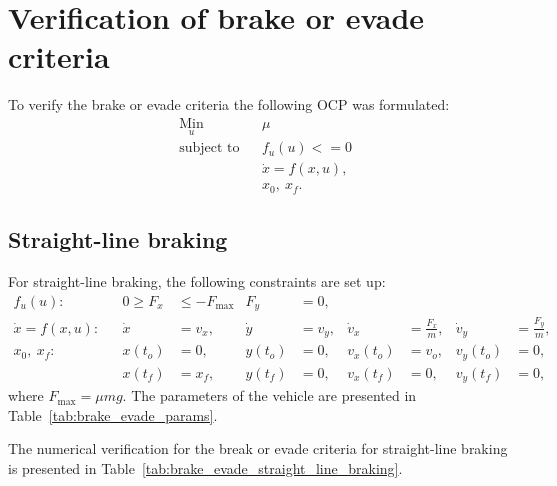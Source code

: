 \chapter{Verification of brake or evade criteria}

To verify the brake or evade criteria the following OCP was formulated:
\begin{align}
    & \underset{u}{\text{Min}}
    & & \mu\\
%
    & \text{subject to} 
    & & f_u(u) <= 0\\
%
    &&& \dot x = f(x,u),\\
%
    &&& x_0,\ x_f.
\end{align}

\section{Straight-line braking}
For straight-line braking, the following constraints are set up:
\begin{align}
    f_u(u): && 0 \geq F_x &\leq -F_{\text{max}} & F_y &= 0,\\
    \dot x = f(x,u): && \dot x &= v_x, & \dot y &= v_y, & \dot v_x &= \frac{F_x}{m}, & \dot v_y &= \frac{F_y}{m},\\
    x_0,\ x_f: && x(t_o) &= 0, & y(t_o) &= 0, & v_x(t_o) &= v_o, & v_y(t_o) &= 0,\\
    && x(t_f) &= x_f, & y(t_f) &= 0, & v_x(t_f) &= 0, & v_y(t_f) &= 0,
\end{align}
where $F_{\text{max}} = \mu m g$. The parameters of the vehicle are presented in Table~\ref{tab:brake_evade_params}.

The numerical verification for the break or evade criteria for straight-line braking is presented in Table~\ref{tab:brake_evade_straight_line_braking}.

